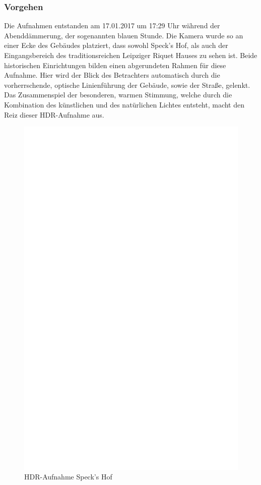 \documentclass[liststotoc,bibtotoc,fontsize=14pt,]{scrreprt}
\begin{document}
			
	\subsubsection{Vorgehen}
	Die Aufnahmen entstanden am 17.01.2017 um 17:29 Uhr während der Abend\-dämmerung, der sogenannten blauen Stunde. Die Kamera wurde so an einer Ecke des Gebäudes platziert, dass sowohl Speck's Hof, als auch der Eingangsbereich des traditionsreichen Leipziger Riquet Hauses zu sehen ist. Beide historischen Einrichtungen bilden einen abgerundeten Rahmen für diese Aufnahme. Hier wird der Blick des Betrachters automatisch durch die vorherrschende, optische Linienführung der Gebäude, sowie der Straße, gelenkt. Das Zusammenspiel der besonderen, warmen Stimmung, welche durch die Kombination des künstlichen und des natürlichen Lichtes entsteht, macht den Reiz dieser  HDR-Aufnahme aus.
			
		
					 \newpage
					 \begin{figure}[h]
					 	\includegraphics[width=\linewidth]{img/ph.jpg}
					 	\caption{HDR-Aufnahme Speck's Hof}
					 \end{figure}
			
\end{document}

